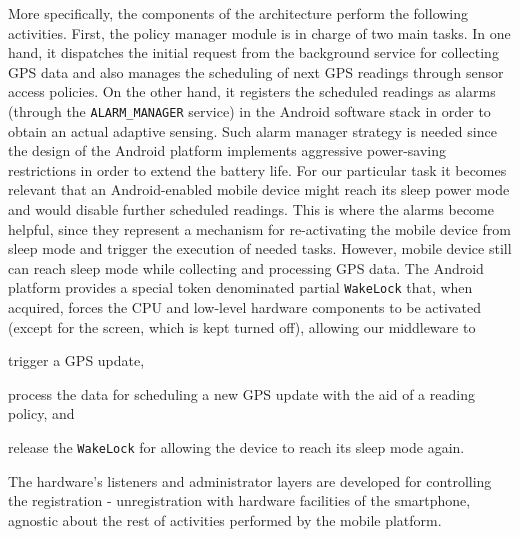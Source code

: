 \documentclass[ENG,PhD]{cinvestav}
\begin{document}
More specifically, the components of the architecture perform the following activities.
First, the policy manager module is in charge of two main tasks.
In one hand, it dispatches the initial request from the background service for collecting GPS data and also manages the scheduling of next GPS readings through sensor access policies.
On the other hand, it registers the scheduled readings as alarms (through the \verb|ALARM_MANAGER| service) in the Android software stack in order to obtain an actual adaptive sensing.
Such alarm manager strategy is needed since the design of the Android platform implements aggressive power-saving restrictions in order to extend the battery life.
For our particular task it becomes relevant that an Android-enabled mobile device might reach its sleep power mode and would disable further scheduled readings.
This is where the alarms become helpful, since they represent a mechanism for re-activating the mobile device from sleep mode and trigger the execution of needed tasks.
However, mobile device still can reach sleep mode while collecting and processing GPS data.
The Android platform provides a special token denominated partial \verb|WakeLock| that, when acquired, forces the CPU and low-level hardware components to be activated (except for the screen, which is kept turned off), allowing our middleware to
\begin{listahorizontal}
  \item trigger a GPS update,
  \item process the data for scheduling a new GPS update with the aid of a reading policy, and
  \item release the \verb|WakeLock| for allowing the device to reach its sleep mode again.
\end{listahorizontal}

The hardware's listeners and administrator layers are developed for controlling the registration - unregistration with hardware facilities of the smartphone, agnostic about the rest of activities performed by the mobile platform.

\end{document}
